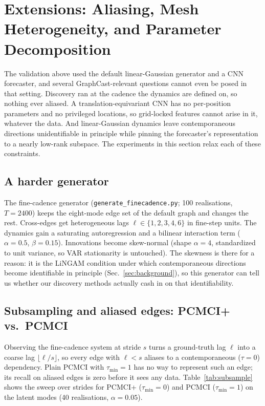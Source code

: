 \section{Extensions: Aliasing, Mesh Heterogeneity, and Parameter Decomposition}
\label{sec:ext}

The validation above used the default linear-Gaussian generator and a CNN
forecaster, and several GraphCast-relevant questions cannot even be posed in that
setting. Discovery ran at the cadence the dynamics are defined on, so nothing ever
aliased. A translation-equivariant CNN has no per-position parameters and no
privileged locations, so grid-locked features cannot arise in it, whatever the
data. And linear-Gaussian dynamics leave contemporaneous directions unidentifiable
in principle while pinning the forecaster's representation to a nearly low-rank
subspace. The experiments in this section relax each of these constraints.

\subsection{A harder generator}
\label{sec:finecadence}

The fine-cadence generator (\texttt{generate\_finecadence.py}; 100 realisations,
$T=2400$) keeps the eight-mode edge set of the default graph and changes the rest.
Cross-edges get heterogeneous lags $\ell \in \{1,2,3,4,6\}$ in fine-step units. The
dynamics gain a saturating autoregression and a bilinear interaction term
($\alpha=0.5$, $\beta=0.15$). Innovations become skew-normal (shape $\alpha=4$,
standardized to unit variance, so VAR stationarity is untouched). The skewness is
there for a reason: it is the LiNGAM condition under which contemporaneous
directions become identifiable in principle (Sec.~\ref{sec:background}), so this
generator can tell us whether our discovery methods actually cash in on that
identifiability.

\subsection{Subsampling and aliased edges: PCMCI+ vs.\ PCMCI}
\label{sec:subsample}

Observing the fine-cadence system at stride $s$ turns a ground-truth lag $\ell$
into a coarse lag $\lfloor \ell/s \rfloor$, so every edge with $\ell < s$ aliases
to a contemporaneous ($\tau=0$) dependency. Plain PCMCI with $\tau_{\min}=1$ has no
way to represent such an edge; its recall on aliased edges is zero before it sees
any data. Table~\ref{tab:subsample} shows the sweep over strides for PCMCI+
($\tau_{\min}=0$) and PCMCI ($\tau_{\min}=1$) on the latent modes (40 realisations,
$\alpha=0.05$).

